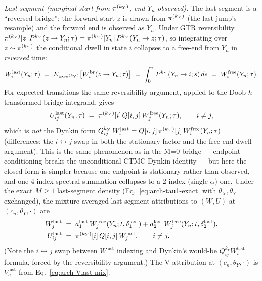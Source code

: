 \emph{Last segment (marginal start from $\pi^{(k_Y)}$, end $Y_n$
observed).} The last segment is a ``reversed bridge'': the forward
start $z$ is drawn from $\pi^{(k_Y)}$ (the last jump's resample)
and the forward end is observed as $Y_n$. Under GTR reversibility
$\pi^{(k_Y)}[z]\, P^{k_Y}(z \to Y_n; \tau) = \pi^{(k_Y)}[Y_n]\,
P^{k_Y}(Y_n \to z; \tau)$, so integrating over $z \sim
\pi^{(k_Y)}$ the conditional dwell in state $i$ collapses to a
free-end from $Y_n$ in \emph{reversed} time:
\begin{equation}
  W_i^{\mathrm{last}}(Y_n; \tau)
  \;=\; E_{z \sim \pi^{(k_Y)}}\bigl[
    W^{\mathrm{br}}_i(z \to Y_n; \tau)\bigr]
  \;=\; \int_0^\tau P^{k_Y}(Y_n \to i; s)\, ds
  \;=\; W_i^{\mathrm{free}}(Y_n; \tau).
  \label{eq:arch-last-W}
\end{equation}
For expected transitions the same reversibility argument, applied to
the Doob-$h$-transformed bridge integrand, gives
\begin{equation}
  U^{\mathrm{last}}_{ij}(Y_n; \tau)
    \;=\; \pi^{(k_Y)}[i]\, Q[i, j]\, W_j^{\mathrm{free}}(Y_n; \tau),
    \qquad i \ne j,
  \label{eq:arch-last-U}
\end{equation}
which is \emph{not} the Dynkin form $Q^{k_Y}_{ij}\, W_i^{\mathrm{last}}
= Q[i, j]\, \pi^{(k_Y)}[j]\, W_i^{\mathrm{free}}(Y_n; \tau)$
(differences: the $i \leftrightarrow j$ swap in both the stationary
factor and the free-end-dwell argument). This is the same phenomenon
as in the M{=}0 bridge --- endpoint conditioning breaks the
unconditional-CTMC Dynkin identity --- but here the closed form is
simpler because one endpoint is stationary rather than observed, and
one 4-index spectral summation collapses to a 2-index (single-$\alpha$)
one. Under the exact $M \geq 1$ last-segment density
(Eq.~\ref{eq:arch-tau1-exact} with $\theta_X, \theta_Y$ exchanged), the
mixture-averaged last-segment attributions to $(W, U)$ at
$(c_n, \theta_Y, \cdot)$ are
\begin{align}
  W^{\text{last}}_j
  &\;=\; a_1^{\text{last}}\, W_j^{\mathrm{free}}(Y_n; t, \delta_1^{\text{last}})
    + a_2^{\text{last}}\, W_j^{\mathrm{free}}(Y_n; t, \delta_2^{\text{last}}),
  \label{eq:arch-Wlast-mix} \\
  U^{\text{last}}_{ij}
  &\;=\; \pi^{(k_Y)}[i]\, Q[i, j]\, W^{\text{last}}_j,
  \qquad i \ne j.
  \label{eq:arch-Ulast-mix}
\end{align}
(Note the $i \leftrightarrow j$ swap between $W^{\text{last}}$
indexing and Dynkin's would-be $Q^{k_Y}_{ij} W^{\text{last}}_i$
formula, forced by the reversibility argument.) The V attribution at
$(c_n, \theta_Y, \cdot)$ is $V^{\text{last}}_a$ from
Eq.~\ref{eq:arch-Vlast-mix}.

